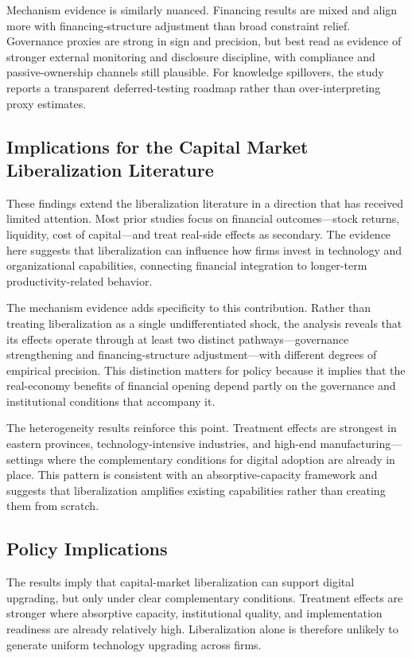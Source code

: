 Mechanism evidence is similarly nuanced. Financing results are mixed and align more with financing-structure adjustment than broad constraint relief. Governance proxies are strong in sign and precision, but best read as evidence of stronger external monitoring and disclosure discipline, with compliance and passive-ownership channels still plausible. For knowledge spillovers, the study reports a transparent deferred-testing roadmap rather than over-interpreting proxy estimates.

\subsection{Implications for the Capital Market Liberalization Literature}

These findings extend the liberalization literature in a direction that has received limited attention. Most prior studies focus on financial outcomes---stock returns, liquidity, cost of capital---and treat real-side effects as secondary. The evidence here suggests that liberalization can influence how firms invest in technology and organizational capabilities, connecting financial integration to longer-term productivity-related behavior.

The mechanism evidence adds specificity to this contribution. Rather than treating liberalization as a single undifferentiated shock, the analysis reveals that its effects operate through at least two distinct pathways---governance strengthening and financing-structure adjustment---with different degrees of empirical precision. This distinction matters for policy because it implies that the real-economy benefits of financial opening depend partly on the governance and institutional conditions that accompany it.

The heterogeneity results reinforce this point. Treatment effects are strongest in eastern provinces, technology-intensive industries, and high-end manufacturing---settings where the complementary conditions for digital adoption are already in place. This pattern is consistent with an absorptive-capacity framework and suggests that liberalization amplifies existing capabilities rather than creating them from scratch.

\subsection{Policy Implications}

The results imply that capital-market liberalization can support digital upgrading, but only under clear complementary conditions. Treatment effects are stronger where absorptive capacity, institutional quality, and implementation readiness are already relatively high. Liberalization alone is therefore unlikely to generate uniform technology upgrading across firms.

